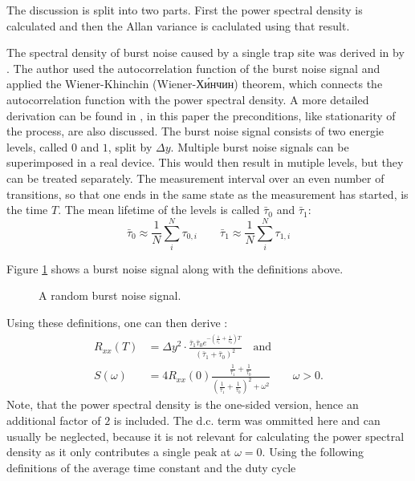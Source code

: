 The discussion is split into two parts. First the power spectral density is calculated and then the Allan variance is caclulated using that result.

The spectral density of burst noise caused by a single trap site was derived in \cite{burst_noise_wiener_khinchin} by \citeauthor{burst_noise_wiener_khinchin}. The author used the autocorrelation function of the burst noise signal and applied the Wiener-Khinchin (Wiener-Хи́нчин) theorem, which connects the autocorrelation function with the power spectral density. A more detailed derivation can be found in \cite{fundamentals_of_noise_processes}, in this paper the preconditions, like stationarity of the process, are also discussed. The burst noise signal consists of two energie levels, called $0$ and $1$, split by $\Delta y$. Multiple burst noise signals can be superimposed in a real device. This would then result in mutiple levels, but they can be treated separately. The measurement interval over an even number of transitions, so that one ends in the same state as the measurement has started, is the time $T$. The mean lifetime of the levels is called $\bar \tau_0$ and $\bar \tau_1$:
\begin{equation}
    \bar \tau_{0} \approx \frac 1 N \sum_{i}^N \tau_{0,i} \qquad \bar \tau_{1} \approx \frac 1 N \sum_{i}^N \tau_{1,i}
\end{equation}

Figure \ref{fig:burst_noise} shows a burst noise signal along with the definitions above.

\begin{figure}[hb]
    \centering
    \caption{A random burst noise signal.}
    \label{fig:burst_noise}
\end{figure}

Using these definitions, one can then derive \cite{burst_noise_wiener_khinchin}:
\begin{align}
    R_{xx} (T) &= \Delta y^2 \cdot \frac{\bar \tau_1 \bar \tau_0 e^{-\left(\frac{1}{\bar \tau_1}+\frac{1}{\bar \tau_0}\right)T}}{\left(\bar \tau_1 + \bar \tau_0\right)^2} \quad \text{and} \label{eqn:burst_noise_correlation}\\
    S(\omega) &= 4 R_{xx}(0) \frac{\frac{1}{\bar \tau_1} + \frac{1}{\bar \tau_0}}{\left(\frac{1}{\bar \tau_1} + \frac{1}{\bar \tau_0}\right)^2 + \omega^2} \qquad \omega > 0 . \label{eqn:burst_noise_psd}
\end{align}
Note, that the power spectral density is the one-sided version, hence an additional factor of $2$ is included. The d.c. term was ommitted here and can usually be neglected, because it is not relevant for calculating the power spectral density as it only contributes a single peak at $\omega=0$. Using the following definitions of the average time constant and the duty cycle

